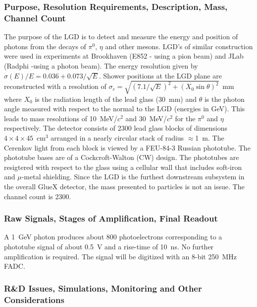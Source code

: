 \subsubsection*{Purpose, Resolution Requirements, Description, Mass, Channel Count}

The purpose of the LGD is to detect and measure the energy and position of photons
from the decays of $\pi^0$, $\eta$ and other mesons.  LGD's of similar construction
were used in experiments at Brookhaven (E852 - using a pion beam) and JLab (Radphi
-using a photon beam).  
 The energy resolution
given by $\sigma(E)/E = 0.036 + 0.073/\sqrt{E}$.
Shower positions at the LGD plane
 are reconstructed with a resolution
 of $\sigma_r = \sqrt{(7.1/\sqrt{E})^2 + (X_0 \sin\theta)^2}$~mm
 where $X_0$ is the radiation length of the lead glass
 (30~mm) and $\theta$ is the photon angle measured with respect
 to the normal to the LGD (energies in GeV). This leads to mass resolutions of 10~MeV/$c^2$
 and 30~MeV/$c^2$ for the $\pi^0$ and $\eta$ respectively.
   The detector consists of 2300 lead
glass blocks of dimensions $4 \times 4 \times 45$~cm$^3$ arranged in a nearly circular
stack of radius $\approx$1~m.
  The Cerenkov light from each block is viewed by a FEU-84-3 Russian phototube. 
The phototube bases are of a Cockcroft-Walton (CW) design.  The phototubes are resigtered 
with respect to the glass using a cellular wall that includes soft-iron and $\mu$-metal
shielding. Since the LGD is the furthest downstream subsystem in the overall
GlueX detector, the mass presented to particles is not an issue.  The channel count is 2300.

\subsubsection*{Raw Signals, Stages of Amplification, Final Readout}

A 1~GeV photon produces about 800 photoelectrons corresponding to a phototube
signal of about 0.5~V and a rise-time of 10~ns.  No further amplification is required.  
The signal will be digitized with an 8-bit 250~MHz FADC.

\subsubsection*{R\&D Issues, Simulations, Monitoring and Other Considerations}

